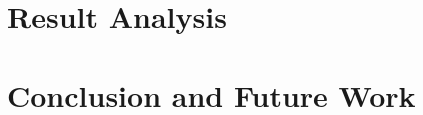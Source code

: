 \documentclass{article}
\begin{document}
\section{Result Analysis}
\label{sec:analysis}


\section{Conclusion and Future Work}
\label{sec:conclusion}




\end{document}
